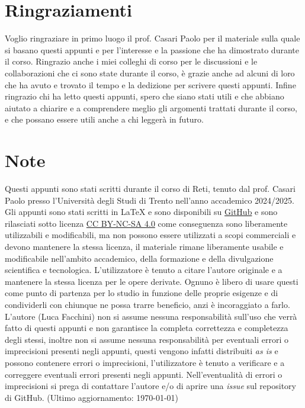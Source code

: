 \documentclass[twoside]{report}
\begin{document}
    \section*{Ringraziamenti}
    Voglio ringraziare in primo luogo il prof. Casari Paolo per il materiale sulla quale si basano questi appunti e per l'interesse e la passione che ha dimostrato durante il corso.\newline
    Ringrazio anche i miei colleghi di corso per le discussioni e le collaborazioni che ci sono state durante il corso, è grazie anche ad alcuni di loro che ha avuto e trovato il tempo e la dedizione per scrivere questi appunti.\newline
    Infine ringrazio chi ha letto questi appunti, spero che siano stati utili e che abbiano aiutato a chiarire e a comprendere meglio gli argomenti trattati durante il corso, e che possano essere utili anche a chi leggerà in futuro.
    \vfill
    \footnotesize\section*{Note}
    Questi appunti sono stati scritti durante il corso di Reti, tenuto dal prof. Casari Paolo presso l'Università degli Studi di Trento nell'anno accademico 2024/2025. Gli appunti sono stati scritti in \LaTeX{} e sono disponibili su \href{https://github.com/lucafano04/appuntisecondoanno}{GitHub} e sono rilasciati sotto licenza \href{https://creativecommons.org/licenses/by-nc-sa/4.0/}{CC BY-NC-SA 4.0} come conseguenza sono liberamente utilizzabili e modificabili, ma non possono essere utilizzati a scopi commerciali e devono mantenere la stessa licenza, il materiale rimane liberamente usabile e modificabile nell'ambito accademico, della formazione e della divulgazione scientifica e tecnologica. L'utilizzatore è tenuto a citare l'autore originale e a mantenere la stessa licenza per le opere derivate. Ognuno è libero di usare questi come punto di partenza per lo studio in funzione delle proprie esigenze e di condividerli con chiunque ne possa trarre beneficio, anzi è incoraggiato a farlo.
    L'autore (Luca Facchini) non si assume nessuna responsabilità sull'uso che verrà fatto di questi appunti e non garantisce la completa correttezza e completezza degli stessi, inoltre non si assume nessuna responsabilità per eventuali errori o imprecisioni presenti negli appunti, questi vengono infatti distribuiti \textit{as is} e possono contenere errori o imprecisioni, l'utilizzatore è tenuto a verificare e a correggere eventuali errori presenti negli appunti. Nell'eventualità di errori o imprecisioni si prega di contattare l'autore e/o di aprire una \textit{issue} sul repository di GitHub. (Ultimo aggiornamento: \today)
\end{document}
